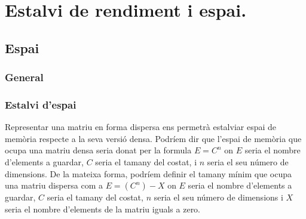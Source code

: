 \documentclass[8pt]{beamer}
\begin{document}
\section{Estalvi de rendiment i espai.}

\subsection{Espai}

\subsubsection{General}

\begin{frame}
  \frametitle{Estalvi d'espai}
Representar una matriu en forma dispersa ens permetrà estalviar espai de memòria respecte a la seva versió densa.
Podríem dir que l'espai de memòria que ocupa una matriu densa seria donat per la formula $E=C^n$ on $E$ seria el nombre d'elements a guardar, $C$ seria el tamany del costat, i $n$ seria el seu número de dimensions.
De la mateixa forma, podríem definir el tamany mínim que ocupa una matriu dispersa com a $E=(C^n)-X$ on $E$ seria el nombre d'elements a guardar, $C$ seria el tamany del costat, $n$ seria el seu número de dimensions i $X$ seria el nombre d'elements de la matriu iguals a zero.
\end{frame}
\end{document}

